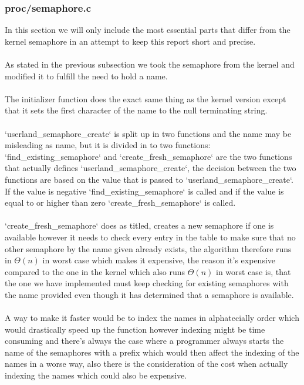 \documentclass[a4paper,12pt,danish]{report}
\begin{document}
\subsubsection{proc/semaphore.c}
In this section we will only include the most essential parts that differ from the kernel semaphore in an attempt to keep this report short and precise.
\\
\\
As stated in the previous subsection we took the semaphore from the kernel and modified it to fulfill the need to hold a name.
\\
\\
The initializer function does the exact same thing as the kernel version except that it sets the first character of the name to the null terminating string.
\\
\\
`userland\_semaphore\_create` is split up in two functions and the name may be misleading as name, but it is divided in to two functions:
\\
`find\_existing\_semaphore` and `create\_fresh\_semaphore` are the two functions that actually defines `userland\_semaphore\_create`, the decision between the two functions are based on the value that is passed to `userland\_semaphore\_create`.
\\
If the value is negative `find\_existing\_semaphore` is called and if the value is equal to or higher than zero `create\_fresh\_semaphore` is called.
\\
\\
`create\_fresh\_semaphore` does as titled, creates a new semaphore if one is available however it needs to check every entry in the table to make sure that no other semaphore by the name given already exists, the algorithm therefore runs in $\Theta(n)$ in worst case which makes it expensive, the reason it's expensive compared to the one in the kernel which also runs $\Theta(n)$ in worst case is, that the one we have implemented must keep checking for existing semaphores with the name provided even though it has determined that a semaphore is available.
\\
\\
A way to make it faster would be to index the names in alphatecially order which would drastically speed up the function however indexing might be time consuming and there's always the case where a programmer always starts the name of the semaphores with a prefix which would then affect the indexing of the names in a worse way, also there is the consideration of the cost when actually indexing the names which could also be expensive.
\end{document}
